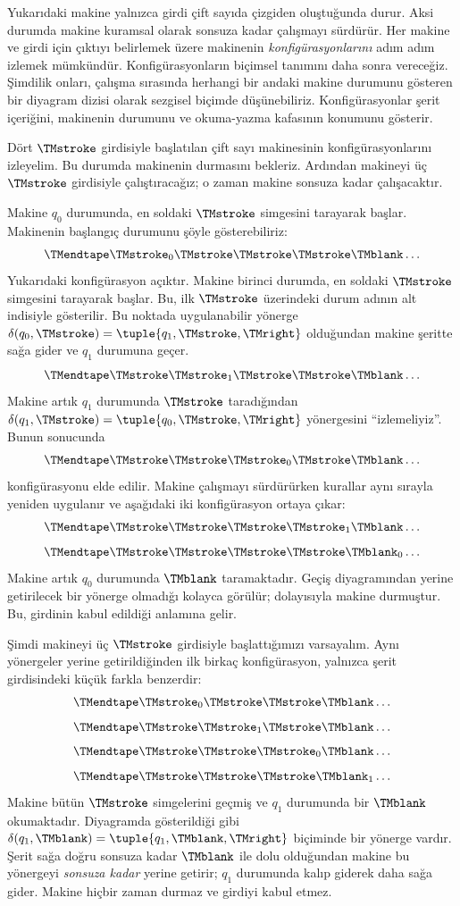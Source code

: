 \documentclass[../../../include/open-logic-section]{subfiles}
\begin{document}
\begin{explain}
Yukarıdaki makine yalnızca girdi çift sayıda çizgiden oluştuğunda durur.
Aksi durumda makine kuramsal olarak sonsuza kadar çalışmayı sürdürür. Her
makine ve girdi için çıktıyı belirlemek üzere makinenin
\emph{konfigürasyonlarını} adım adım izlemek mümkündür. Konfigürasyonların
biçimsel tanımını daha sonra vereceğiz. Şimdilik onları, çalışma sırasında
herhangi bir andaki makine durumunu gösteren bir diyagram dizisi olarak
sezgisel biçimde düşünebiliriz. Konfigürasyonlar şerit içeriğini, makinenin
durumunu ve okuma-yazma kafasının konumunu gösterir.

Dört $\TMstroke$ girdisiyle başlatılan çift sayı makinesinin
konfigürasyonlarını izleyelim. Bu durumda makinenin durmasını bekleriz.
Ardından makineyi üç $\TMstroke$ girdisiyle çalıştıracağız; o zaman makine
sonsuza kadar çalışacaktır.

Makine $q_0$ durumunda, en soldaki $\TMstroke$ simgesini tarayarak başlar.
Makinenin başlangıç durumunu şöyle gösterebiliriz:
\[
\TMendtape \TMstroke_0 \TMstroke \TMstroke \TMstroke \TMblank \ldots
\]
Yukarıdaki konfigürasyon açıktır. Makine birinci durumda, en soldaki
$\TMstroke$ simgesini tarayarak başlar. Bu, ilk $\TMstroke$ üzerindeki durum
adının alt indisiyle gösterilir. Bu noktada uygulanabilir yönerge
$\delta(q_0,\TMstroke)=\tuple{q_1,\TMstroke,\TMright}$ olduğundan makine
şeritte sağa gider ve $q_1$ durumuna geçer.
\[
\TMendtape \TMstroke \TMstroke_1 \TMstroke \TMstroke \TMblank \ldots
\]
Makine artık $q_1$ durumunda $\TMstroke$ taradığından
$\delta(q_1,\TMstroke)=\tuple{q_0,\TMstroke,\TMright}$ yönergesini
``izlemeliyiz''. Bunun sonucunda
\[
\TMendtape \TMstroke \TMstroke \TMstroke_0 \TMstroke \TMblank \ldots
\]
konfigürasyonu elde edilir. Makine çalışmayı sürdürürken kurallar aynı sırayla
yeniden uygulanır ve aşağıdaki iki konfigürasyon ortaya çıkar:
\[
\TMendtape \TMstroke \TMstroke \TMstroke \TMstroke_1 \TMblank \ldots
\]
\[
\TMendtape \TMstroke \TMstroke \TMstroke \TMstroke \TMblank_0 \ldots
\]
Makine artık $q_0$ durumunda $\TMblank$ taramaktadır. Geçiş diyagramından
yerine getirilecek bir yönerge olmadığı kolayca görülür; dolayısıyla makine
durmuştur. Bu, girdinin kabul edildiği anlamına gelir.

Şimdi makineyi üç $\TMstroke$ girdisiyle başlattığımızı varsayalım. Aynı
yönergeler yerine getirildiğinden ilk birkaç konfigürasyon, yalnızca şerit
girdisindeki küçük farkla benzerdir:
\[
\TMendtape \TMstroke_0 \TMstroke \TMstroke \TMblank \ldots
\]
\[
\TMendtape \TMstroke \TMstroke_1 \TMstroke \TMblank \ldots
\]
\[
\TMendtape \TMstroke \TMstroke \TMstroke_0 \TMblank \ldots
\]
\[
\TMendtape \TMstroke \TMstroke \TMstroke \TMblank_1 \ldots
\]
Makine bütün $\TMstroke$ simgelerini geçmiş ve $q_1$ durumunda bir
$\TMblank$ okumaktadır. Diyagramda gösterildiği gibi
$\delta(q_1,\TMblank)=\tuple{q_1,\TMblank,\TMright}$ biçiminde bir yönerge
vardır. Şerit sağa doğru sonsuza kadar $\TMblank$ ile dolu olduğundan makine
bu yönergeyi \emph{sonsuza kadar} yerine getirir; $q_1$ durumunda kalıp
giderek daha sağa gider. Makine hiçbir zaman durmaz ve girdiyi kabul etmez.
\end{explain}
\end{document}
